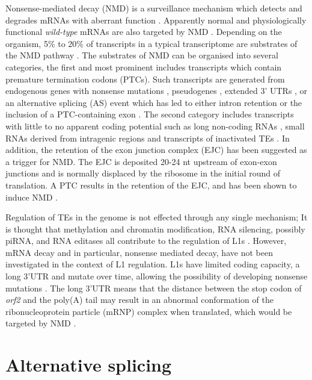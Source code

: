 \documentclass[12pt]{article}
\begin{document}
			Nonsense-mediated decay (NMD) is a surveillance mechanism which detects and degrades mRNAs with aberrant function \citep{ Kervestin12, Lykke-Andersen14}.
			Apparently normal and physiologically functional \textit{wild-type} mRNAs are also targeted by NMD \citep{Schweingruber13}.
			Depending on the organism, 5\% to 20\% of transcripts in a typical transcriptome are substrates of the NMD pathway \citep{He15}.
			The substrates of NMD can be organised into several categories, the first and most prominent includes transcripts which contain premature termination codons (PTCs).
			Such transcripts are generated from endogenous genes with nonsense mutations \citep{Conti05}, pseudogenes \citep{Mcglincy08}, extended 3' UTRs \citep{Garneau07}, or an alternative splicing (AS) event which has led to either intron retention or the inclusion of a PTC-containing exon \citep{Ge14,Ni07}.
			The second category includes transcripts with little to no apparent coding potential such as long non-coding RNAs \citep{Lykke-Andersenb14}, small RNAs derived from intragenic regions \citep{Smith14} and transcripts of inactivated TEs \citep{He03}.
			In addition, the retention of the exon junction complex (EJC) has been suggested as a trigger for NMD. %
			The EJC is deposited 20-24 nt upstream of exon-exon junctions \citep{Le-Hir00} and is normally displaced by the ribosome in the initial round of translation.
			A PTC results in the retention of the EJC, and has been shown to induce NMD \citep{Gehring05, Lykke-Andersen01}. 
			
			Regulation of TEs in the genome is not effected through any single mechanism; It is thought that methylation and chromatin modification, RNA silencing, possibly piRNA, and RNA editases all contribute to the regulation of L1s \citep{Bodak14}.
			However, mRNA decay and in particular, nonsense mediated decay, have not been investigated in the context of L1 regulation.
			L1s have limited coding capacity, a long 3'UTR and mutate over time, allowing the possibility of developing nonsense mutations \citep{Penzkofer05, Goodier13}.
			The long 3'UTR means that the distance between the stop codon of \textit{orf2} and the poly(A) tail may result in an abnormal conformation of the ribonucleoprotein particle (mRNP) complex when translated, which would be targeted by NMD \citep{Garneau07}.

		
	\section{Alternative splicing}
		
\end{document}
